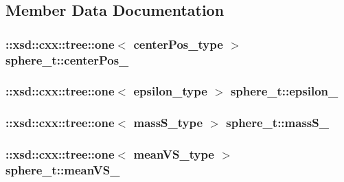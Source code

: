 \subsection{Member Data Documentation}
\hypertarget{classsphere__t_a0737ba2a8523d266f64b084f3efa9a48}{
\subsubsection[{center\-Pos\-\_\-}]{\setlength{\rightskip}{0pt plus 5cm}\-::xsd\-::cxx\-::tree\-::one$<$ {\bf center\-Pos\-\_\-type} $>$ sphere\-\_\-t\-::center\-Pos\-\_\-\hspace{0.3cm}{\ttfamily [protected]}}}\label{classsphere__t_a0737ba2a8523d266f64b084f3efa9a48}
\hypertarget{classsphere__t_afe66a61532491a5d947d917b89c94a44}{
\subsubsection[{epsilon\-\_\-}]{\setlength{\rightskip}{0pt plus 5cm}\-::xsd\-::cxx\-::tree\-::one$<$ {\bf epsilon\-\_\-type} $>$ sphere\-\_\-t\-::epsilon\-\_\-\hspace{0.3cm}{\ttfamily [protected]}}}\label{classsphere__t_afe66a61532491a5d947d917b89c94a44}
\hypertarget{classsphere__t_a155c503f91068e98cac6e50e162fd8e8}{
\subsubsection[{mass\-S\-\_\-}]{\setlength{\rightskip}{0pt plus 5cm}\-::xsd\-::cxx\-::tree\-::one$<$ {\bf mass\-S\-\_\-type} $>$ sphere\-\_\-t\-::mass\-S\-\_\-\hspace{0.3cm}{\ttfamily [protected]}}}\label{classsphere__t_a155c503f91068e98cac6e50e162fd8e8}
\hypertarget{classsphere__t_ae69c65c02185ee644621ec5f19050092}{
\subsubsection[{mean\-V\-S\-\_\-}]{\setlength{\rightskip}{0pt plus 5cm}\-::xsd\-::cxx\-::tree\-::one$<$ {\bf mean\-V\-S\-\_\-type} $>$ sphere\-\_\-t\-::mean\-V\-S\-\_\-\hspace{0.3cm}{\ttfamily [protected]}}}\label{classsphere__t_ae69c65c02185ee644621ec5f19050092}

